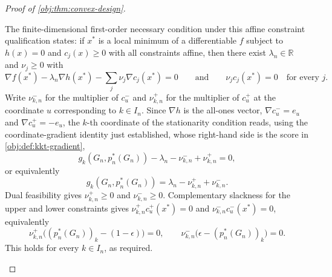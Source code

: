 \begin{proof}[Proof of \cref{obj:thm:convex-design}]
\begin{enumerate}
The finite-dimensional first-order necessary condition under this affine constraint qualification states: if \(x^*\) is a local minimum of a differentiable \(f\) subject to \(h(x)=0\) and \(c_j(x)\ge0\) with all constraints affine, then there exist \(\lambda_n\in\mathbb R\) and \(\nu_j\ge0\) with
\[
\nabla f(x^*)-\lambda_n\nabla h(x^*)-\sum_j\nu_j\nabla c_j(x^*)=0
\qquad\text{and}\qquad
\nu_jc_j(x^*)=0\quad\text{for every }j.
\]
Write \(\nu^-_{k,n}\) for the multiplier of \(c^-_u\) and \(\nu^+_{k,n}\) for the multiplier of \(c^+_u\) at the coordinate \(u\) corresponding to \(k\in I_n\).  Since \(\nabla h\) is the all-ones vector, \(\nabla c_u^-=e_u\) and \(\nabla c_u^+=-e_u\), the \(k\)-th coordinate of the stationarity condition reads, using the coordinate-gradient identity just established, whose right-hand side is the score in \cref{obj:def:kkt-gradient},
\[
g_k(G_n,p_n^*(G_n))
-\lambda_n-\nu^-_{k,n}+\nu^+_{k,n}=0,
\]
or equivalently
\[
g_k(G_n,p_n^*(G_n))
=\lambda_n-\nu^+_{k,n}+\nu^-_{k,n}.
\]
Dual feasibility gives \(\nu^+_{k,n}\ge0\) and \(\nu^-_{k,n}\ge0\).  Complementary slackness for the upper and lower constraints gives \(\nu^+_{k,n}c_u^+(x^*)=0\) and \(\nu^-_{k,n}c_u^-(x^*)=0\), equivalently
\[
\nu^+_{k,n}\bigl((p_n^*(G_n))_k-(1-\epsilon)\bigr)=0,
\qquad
\nu^-_{k,n}\bigl(\epsilon-(p_n^*(G_n))_k\bigr)=0.
\]
This holds for every \(k\in I_n\), as required.
\end{enumerate}
\end{proof}

